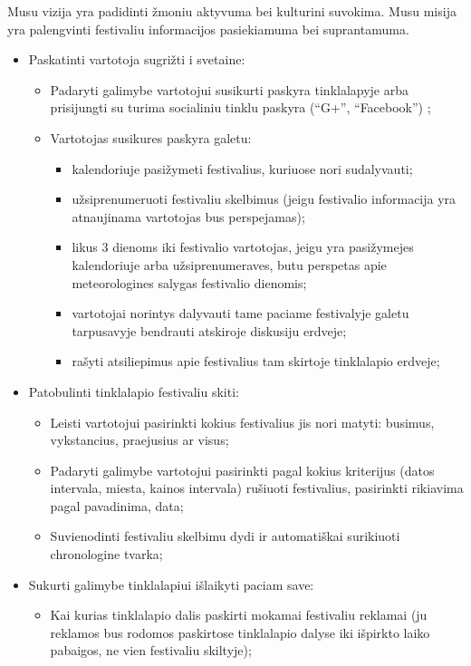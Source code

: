 ﻿\documentclass{VUMIFPSkursinis}
\begin{document}
Musu vizija yra padidinti žmoniu aktyvuma bei kulturini suvokima.
Musu misija yra palengvinti festivaliu informacijos pasiekiamuma bei suprantamuma.
\begin{itemize}
\item Paskatinti vartotoja sugrižti i svetaine:
	\begin{itemize}
    \item Padaryti galimybe vartotojui susikurti paskyra tinklalapyje arba prisijungti su turima socialiniu tinklu paskyra (“G+”, “Facebook”) ;
    \item Vartotojas susikures paskyra galetu:
        \begin{itemize}
        \item kalendoriuje pasižymeti festivalius, kuriuose nori sudalyvauti;
        \item užsiprenumeruoti festivaliu skelbimus (jeigu festivalio informacija yra atnaujinama vartotojas bus perspejamas);
        \item likus 3 dienoms iki festivalio vartotojas, jeigu yra pasižymejes kalendoriuje arba užsiprenumeraves, butu perspetas apie meteorologines salygas festivalio dienomis;
        \item vartotojai norintys dalyvauti tame paciame festivalyje galetu tarpusavyje bendrauti atskiroje diskusiju erdveje;
        \item rašyti atsiliepimus apie festivalius tam skirtoje tinklalapio erdveje;
        \end{itemize}
    \end{itemize}
\item Patobulinti tinklalapio festivaliu skiti:
    \begin{itemize}
    \item Leisti vartotojui pasirinkti kokius festivalius jis nori matyti: busimus, vykstancius, praejusius ar visus;
    \item Padaryti galimybe vartotojui pasirinkti pagal kokius kriterijus (datos intervala, miesta, kainos intervala) rušiuoti festivalius, pasirinkti rikiavima pagal pavadinima, data;
    \item Suvienodinti festivaliu skelbimu dydi ir automatiškai surikiuoti chronologine tvarka;
    \end{itemize}
\item Sukurti galimybe tinklalapiui išlaikyti paciam save:
    \begin{itemize}
    \item Kai kurias tinklalapio dalis paskirti mokamai festivaliu reklamai (ju reklamos bus rodomos paskirtose tinklalapio dalyse iki išpirkto laiko pabaigos, ne vien festivaliu skiltyje);

\end{itemize}
\end{itemize}
\end{document}
